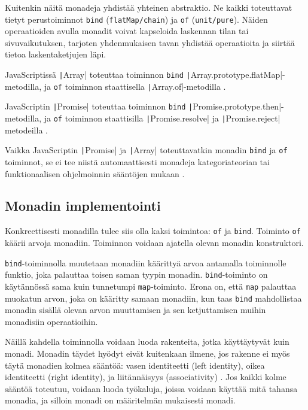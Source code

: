 Kuitenkin näitä monadeja yhdistää yhteinen abstraktio. Ne kaikki toteuttavat tietyt perustoiminnot \texttt{bind} (\texttt{flatMap/chain}) ja \texttt{of} (\texttt{unit/pure}). Näiden operaatioiden avulla monadit voivat kapseloida laskennan tilan tai sivuvaikutuksen, tarjoten yhdenmukaisen tavan yhdistää operaatioita ja siirtää tietoa laskentaketjujen läpi.

JavaScriptissä \texttt|Array| toteuttaa toiminnon \texttt{bind} \texttt|Array.prototype.flatMap|-metodilla, ja \texttt{of} toiminnon staattisella \texttt|Array.of|-metodilla \cite{stackoverflow_flatmap_monad,stackoverflow_js_array_monad}.


JavaScriptin \texttt|Promise| toteuttaa toiminnon \texttt{bind} \texttt|Promise.prototype.then|-metodilla, ja \texttt{of} toiminnon staattisilla \texttt|Promise.resolve| ja \texttt|Promise.reject| metodeilla \cite{read-it-later-11481,stackoverflow:why_monad,promises-spec-94}.

Vaikka JavaScriptin \texttt|Promise| ja \texttt|Array| toteuttavatkin monadin \texttt{bind} ja \texttt{of} toiminnot, se ei tee niistä automaattisesti monadeja kategoriateorian tai funktionaalisen ohjelmoinnin sääntöjen mukaan \cite{promises-spec-94,stackoverflow:why_monad,stackoverflow_js_array_monad}.


\subsection{Monadin implementointi}

Konkreettisesti monadilla tulee siis olla kaksi toimintoa: \texttt{of} ja \texttt{bind}. Toiminto \texttt{of} käärii arvoja monadiin. Toiminnon voidaan ajatella olevan monadin konstruktori. \citep{stackoverflow_what_monad}

\texttt{bind}-toiminnolla muutetaan monadiin käärittyä arvoa antamalla toiminnolle funktio, joka palauttaa toisen saman tyypin monadin. \cite{stackoverflow_what_monad} \texttt{bind}-toiminto on käytännössä sama kuin tunnetumpi \texttt{map}-toiminto. Erona on, että \texttt{map} palauttaa muokatun arvon, joka on kääritty samaan monadiin, kun taas \texttt{bind} mahdollistaa monadin sisällä olevan arvon muuttamisen ja sen ketjuttamisen muihin monadisiin operaatioihin.

Näillä kahdella toiminnolla voidaan luoda rakenteita, jotka käyttäytyvät kuin monadi. Monadin täydet hyödyt eivät kuitenkaan ilmene, jos rakenne ei myös täytä monadien kolmea sääntöä: vasen identiteetti (left identity), oikea identiteetti (right identity), ja liitännäisyys (associativity) \cite{haskellmonadlaws}. Jos kaikki kolme sääntöä toteutuu, voidaan luoda työkaluja, joissa voidaan käyttää mitä tahansa monadia, ja silloin monadi on määritelmän mukaisesti monadi.

